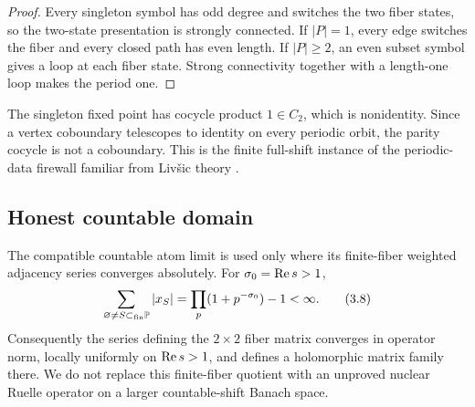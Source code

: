 \begin{proof}
Every singleton symbol has odd degree and switches the two fiber states, so
the two-state presentation is strongly connected.  If \(|P|=1\), every edge
switches the fiber and every closed path has even length.  If \(|P|\ge2\), an
even subset symbol gives a loop at each fiber state.  Strong connectivity
together with a length-one loop makes the period one.
\end{proof}

The singleton fixed point has cocycle product \(1\in C_2\), which is
nonidentity.  Since a vertex coboundary telescopes to identity on every
periodic orbit, the parity cocycle is not a coboundary.  This is the finite
full-shift instance of the periodic-data firewall familiar from Livšic theory
\citep{Livsic1972,Kalinin2011}.

\subsection{Honest countable domain}

The compatible countable atom limit is used only where its finite-fiber
weighted adjacency series converges absolutely.  For
\(\sigma_0=\operatorname{Re} s>1\),
\[
\sum_{\varnothing\ne S\subset_{\rm fin}\mathbb P}|x_S|
=\prod_p(1+p^{-\sigma_0})-1<\infty.
\tag{3.8}\label{3.8}
\]
Consequently the series defining the \(2\times2\) fiber matrix converges in
operator norm, locally uniformly on \(\operatorname{Re} s>1\), and defines a holomorphic
matrix family there.  We do not replace this finite-fiber quotient with an
unproved nuclear Ruelle operator on a larger countable-shift Banach space.
